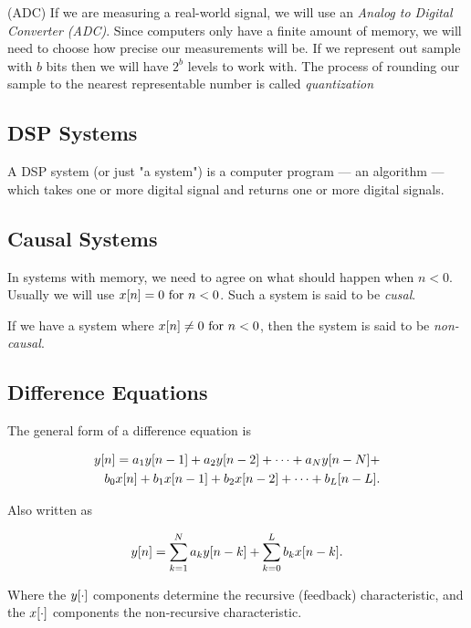 \documentclass[11pt]{article}
\let\originalleft\left
\let\originalright\right
\renewcommand{\left}{\mathopen{}\mathclose\bgroup\originalleft}
\renewcommand{\right}{\aftergroup\egroup\originalright}
\def\lsqb{\left[}
\def\rsqb{\right]}
\def\sqb#1{\lsqb #1 \rsqb}
\begin{document}
\index(ADC)
If we are measuring a real-world signal, we will use an \textit{Analog to Digital Converter (ADC)}. Since computers only have a finite amount of memory, we will need to choose how precise our measurements will be. If we represent out sample with $b$ bits then we will have $2^b$ levels to work with. The process of rounding our sample to the nearest representable number is called \textit{quantization}

\subsection{DSP Systems}
A DSP system (or just "a system") is a computer program --- an algorithm --- which takes one or more digital signal and returns one or more digital signals.

\subsection{Causal Systems}
In systems with memory, we need to agree on what should happen when $n < 0$. Usually we will use $x\left[n\right] = 0 \text{ for } n < 0$. Such a system is said to be \textit{cusal}.

If we have a system where $x\left[n\right] \neq 0 \text{ for } n < 0$, then the system is said to be \textit{non-causal}.

\subsection{Difference Equations}
The general form of a difference equation is

\begin{equation}
\begin{split}
    y\sqb{n} = a_1 y\sqb{n - 1} + a_2 y\sqb{n-2} + \dots + a_N y\sqb{n-N} + \\
        b_0 x\sqb{n} + b_1 x\sqb{n - 1} + b_2 x\sqb{n - 2} + \dots + b_L\sqb{n - L}.
\end{split}
\end{equation}

Also written as

\begin{equation}
    y\sqb{n} = \sum_{k=1}^N a_k y\sqb{n - k} + \sum_{k=0}^L b_k x\sqb{n - k}.
\end{equation}

Where the $y\sqb{\cdot}$ components determine the recursive (feedback) characteristic, and the $x\sqb{\cdot}$ components the non-recursive characteristic.
\end{document}
